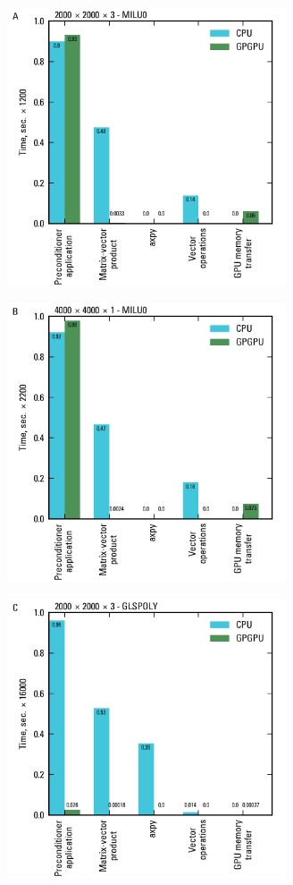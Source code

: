 \documentclass[12pt]{article}
\begin{document}
\newpage
\begin{figure}[hp]
	\begin{subfigure}[b]{0.5\textwidth}
		\centering
  		\includegraphics[width=8.25cm]{Figure4a.png}
	\end{subfigure}
	\begin{subfigure}[b]{0.5\textwidth}
		\centering
  		\includegraphics[width=8.25cm]{Figure4b.png}
	\end{subfigure}
	\begin{subfigure}[b]{0.5\textwidth}
		\centering
  		\includegraphics[width=8.25cm]{Figure4c.png}

\end{subfigure}
\end{figure}
\end{document}
